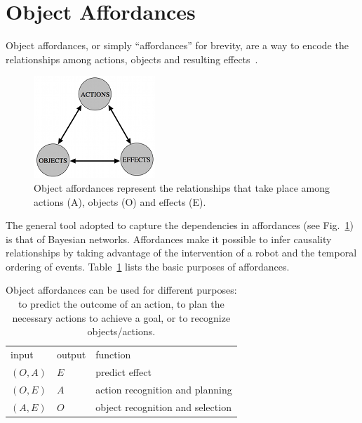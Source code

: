 \section{Object Affordances}
\label{sec:affordances}

Object affordances, or simply ``affordances'' for brevity, are a way to encode the relationships among actions, objects and resulting effects~\cite{montesano:2008}.

\begin{figure}
\centering
\includegraphics{figures/affordances}
\caption[Object affordances]{Object affordances represent the relationships that take place among actions (A), objects (O) and effects (E).}
\label{img:affordances}
\end{figure}

The general tool adopted to capture the dependencies in affordances (see Fig.~\ref{img:affordances}) is that of Bayesian networks. Affordances make it possible to infer causality relationships by taking advantage of the intervention of a robot and the temporal ordering of events. Table~\ref{tab:affordances} lists the basic purposes of affordances.

\begin{table}
\caption[Purposes of object affordances]{Object affordances can be used for different purposes: to predict the outcome of an action, to plan the necessary actions to achieve a goal, or to recognize objects/actions.}
\label{tab:affordances}
\centering
\medskip
\begin{tabular}{*{3}{l}}
\toprule
input & output & function \\
\otoprule
$(O,A)$ & $E$ & predict effect \\
\midrule
$(O,E)$ & $A$ & action recognition and planning \\
\midrule
$(A,E)$ & $O$ & object recognition and selection \\
\bottomrule
\end{tabular}
\end{table}

